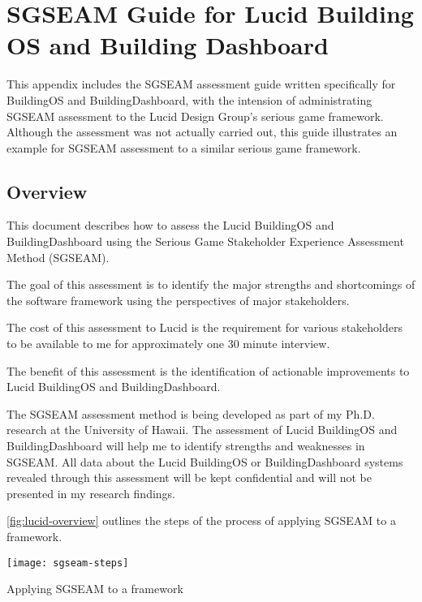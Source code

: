 \chapter{SGSEAM Guide for Lucid Building OS and
Building Dashboard}
\label{app:sgseam-lucid-guide}

This appendix includes the SGSEAM assessment guide written specifically for BuildingOS and BuildingDashboard, with the intension of administrating SGSEAM assessment to the Lucid Design Group's serious game framework. Although the assessment was not actually carried out, this guide illustrates an example for SGSEAM assessment to a similar serious game framework.

\section{Overview}

This document describes how to assess the Lucid BuildingOS and
BuildingDashboard using the Serious Game Stakeholder Experience
Assessment Method (SGSEAM). 

The goal of this assessment is to identify the major strengths and
shortcomings of the software framework using the perspectives of major
stakeholders. 

The cost of this assessment to Lucid is the requirement for various
stakeholders to be available to me for approximately one 30 minute interview. 

The benefit of this assessment is the identification of actionable
improvements to Lucid BuildingOS and BuildingDashboard.

The SGSEAM assessment method is being developed as part of my
Ph.D. research at the University of Hawaii.  The assessment of Lucid
BuildingOS and BuildingDashboard will help me to identify strengths
and weaknesses in SGSEAM.  All data about the Lucid BuildingOS or
BuildingDashboard systems revealed through this assessment will be kept
confidential and will not be presented in my research findings. 

\autoref{fig:lucid-overview} outlines the steps of the process of applying SGSEAM to a framework.

\begin{table}[ht!]
  \center
  \texttt{[image: sgseam-steps]}
  \caption{Applying SGSEAM to a framework}
  \label{fig:lucid-overview}
\end{table}

